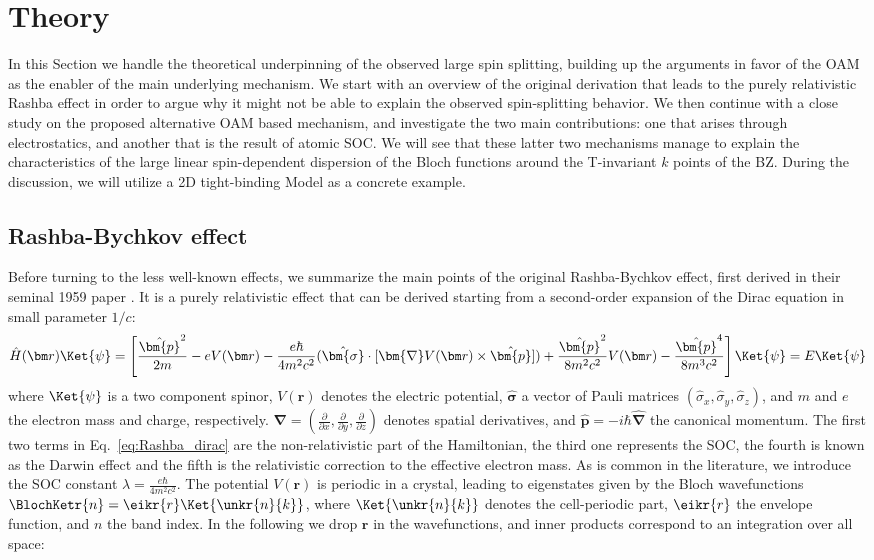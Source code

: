 \section{Theory \label{sec:Rashba_Theory}}
In this Section we handle the theoretical underpinning of the observed large spin splitting, building up the arguments in favor of the \gls{OAM} as the enabler of the main underlying mechanism.
We start with an overview of the original derivation that leads to the purely relativistic Rashba effect in order to argue why it might not be able to explain the observed spin-splitting behavior.
We then continue with a close study on the proposed alternative \gls{OAM} based mechanism, and investigate the two main contributions: one that arises through electrostatics, and another that is the result of atomic \gls{SOC}.
We will see that these latter two mechanisms manage to explain the characteristics of the large linear spin-dependent dispersion of the Bloch functions around the \gls{T}-invariant $k$ points of the \gls{BZ}.
During the discussion, we will utilize a 2D tight-binding Model as a concrete example.

\subsection{Rashba-Bychkov effect \label{sec:Rashba_relativistic}}
Before turning to the less well-known effects, we summarize the main points of the original Rashba-Bychkov effect, first derived in their seminal 1959 paper \cite{Rashba1959SymmetryAr}.
It is a purely relativistic effect that can be derived starting from a second-order expansion of the Dirac equation in small parameter $1/c$:
\begin{equation}
	\label{eq:Rashba_dirac}
	\hat{H}(\bm r) \Ket{\psi} = \left[\frac{\hat{\bm{p}}^2}{2m} - e V(\bm r) - \frac{e \hbar}{4m^2c^2}(
	\hat{\bm{\sigma}}\cdot[\bm{\nabla}V(\bm r) \times\hat{\bm{p}}]) + \frac{\hat{\bm{p}}^2}{8m^2c^2} V(\bm r) - \frac{\hat{\bm{p}}^4}{8m^3c^2}\right]\Ket{\psi} = E\Ket{\psi}
\end{equation}
where $\Ket{\psi}$ is a two component spinor, $V(\bm r)$ denotes the electric potential, $\hat{\bm{\sigma}}$ a vector of Pauli matrices $(\hat{\sigma}_x, \hat{\sigma}_y, \hat{\sigma}_z)$, and $m$ and $e$ the electron mass and charge, respectively.
$\bm \nabla = (\frac{\partial}{\partial x}, \frac{\partial}{\partial y}, \frac{\partial }{\partial z})$ denotes spatial derivatives, and $\hat{\bm{p}} = -i\hbar \hat{\bm{\nabla}}$ the canonical momentum.
The first two terms in Eq.~\eqref{eq:Rashba_dirac} are the non-relativistic part of the Hamiltonian, the third one represents the \gls{SOC}, the fourth is known as the Darwin effect and the fifth is the relativistic correction to the effective electron mass. 
As is common in the literature, we introduce the \gls{SOC} constant $\lambda = \frac{e \hbar}{4m^2c^2}$.
The potential $V(\bm r)$ is periodic in a crystal, leading to eigenstates given by the Bloch wavefunctions $\BlochKetr{n} = \eikr{r} \Ket{\unkr{n}{k}}$, where $\Ket{\unkr{n}{k}}$ denotes the cell-periodic part, $\eikr{r}$ the envelope function, and $n$ the band index.
In the following we drop $\bm{r}$ in the wavefunctions, and inner products correspond to an integration over all space:

